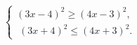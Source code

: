 \begin{ex}[type=ineq_system]
	\begin{condition}
		$\begin{cases} (3x - 4)^2\geqslant(4x - 3)^2 ,\\
			\; (3x + 4)^2\leqslant(4x + 3)^2  .
		\end{cases}$
	\end{condition}
\end{ex}